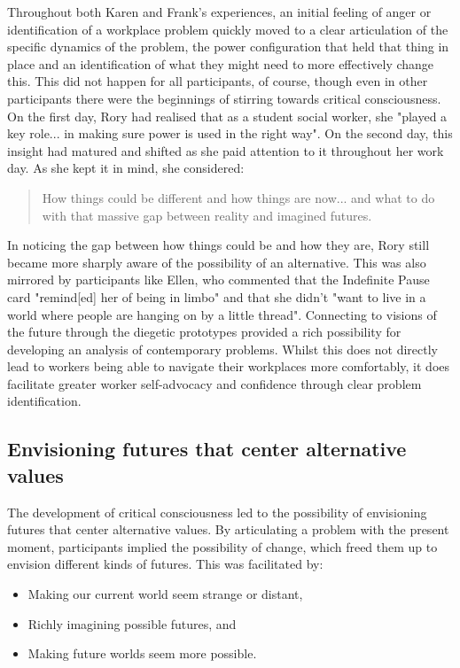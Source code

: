 Throughout both Karen and Frank's experiences, an initial feeling of anger or identification of a workplace problem quickly moved to a clear articulation of the specific dynamics of the problem, the power configuration that held that thing in place and an identification of what they might need to more effectively change this. This did not happen for all participants, of course, though even in other participants there were the beginnings of stirring towards critical consciousness. On the first day, Rory had realised that as a student social worker, she "played a key role... in making sure power is used in the right way". On the second day, this insight had matured and shifted as she paid attention to it throughout her work day. As she kept it in mind, she considered:
\begin{quote}
How things could be different and how things are now... and what to do with that massive gap between reality and imagined futures. 
\end{quote}
In noticing the gap between how things could be and how they are, Rory still became more sharply aware of the possibility of an alternative. This was also mirrored by participants like Ellen, who commented that the Indefinite Pause card "remind[ed] her of being in limbo" and that she didn't "want to live in a world where people are hanging on by a little thread". Connecting to visions of the future through the diegetic prototypes provided a rich possibility for developing an analysis of contemporary problems. Whilst this does not directly lead to workers being able to navigate their workplaces more comfortably, it does facilitate greater worker self-advocacy and confidence through clear problem identification. 

\subsection{Envisioning futures that center alternative values}
The development of critical consciousness led to the possibility of envisioning futures that center alternative values. By articulating a problem with the present moment, participants implied the possibility of change, which freed them up to envision different kinds of futures. This was facilitated by:
\begin{itemize}
    \item Making our current world seem strange or distant,
    \item  Richly imagining possible futures, and
    \item  Making future worlds seem more possible.
\end{itemize}

